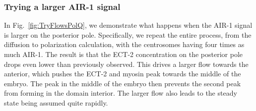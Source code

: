 \documentclass[11pt]{article}
\newcommand{\red}[1]{\color{red}#1\normalcolor}
\begin{document}
\subsubsection{Trying a larger AIR-1 signal}

\red{In Fig.\ \ref{fig:TryFlowsPolQ}, we demonstrate what happens when the AIR-1 signal is larger on the posterior pole. Specifically, we repeat the entire process, from the diffusion to polarization calculation, with the centrosomes having four times as much AIR-1. The result is that the ECT-2 concentration on the posterior pole drops even lower than previously observed. This drives a larger flow towards the anterior, which pushes the ECT-2 and myosin peak towards the middle of the embryo. The peak in the middle of the embryo then prevents the second peak from forming in the domain interior. The larger flow also leads to the steady state being assumed quite rapidly. }
\end{document}
